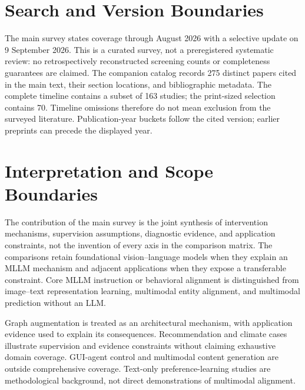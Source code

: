 \documentclass[10pt,onecolumn,journal,compsoc]{IEEEtran}
\begin{document}
\section{Search and Version Boundaries}
The main survey states coverage through August 2026 with a selective update on 9 September 2026. This is a curated survey, not a preregistered systematic review: no retrospectively reconstructed screening counts or completeness guarantees are claimed. The companion catalog records 275 distinct papers cited in the main text, their section locations, and bibliographic metadata. The complete timeline contains a subset of 163 studies; the print-sized selection contains 70. Timeline omissions therefore do not mean exclusion from the surveyed literature. Publication-year buckets follow the cited version; earlier preprints can precede the displayed year.

\section{Interpretation and Scope Boundaries}
The contribution of the main survey is the joint synthesis of intervention mechanisms, supervision assumptions, diagnostic evidence, and application constraints, not the invention of every axis in the comparison matrix. The comparisons retain foundational vision--language models when they explain an MLLM mechanism and adjacent applications when they expose a transferable constraint. Core MLLM instruction or behavioral alignment is distinguished from image--text representation learning, multimodal entity alignment, and multimodal prediction without an LLM.

Graph augmentation is treated as an architectural mechanism, with application evidence used to explain its consequences. Recommendation and climate cases illustrate supervision and evidence constraints without claiming exhaustive domain coverage. GUI-agent control and multimodal content generation are outside comprehensive coverage. Text-only preference-learning studies are methodological background, not direct demonstrations of multimodal alignment.

\clearpage


\end{document}
